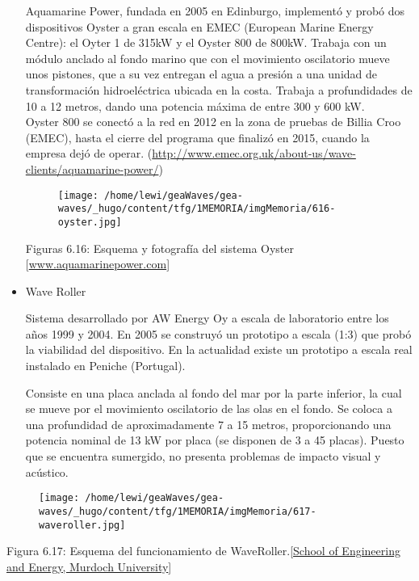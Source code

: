 \documentclass[]{article}
\begin{document}
\begin{itemize}
  Aquamarine Power, fundada en 2005 en Edinburgo, implementó y probó dos
  dispositivos Oyster a gran escala en EMEC (European Marine Energy
  Centre): el Oyter 1 de 315kW y el Oyster 800 de 800kW. Trabaja con un
  módulo anclado al fondo marino que con el movimiento oscilatorio mueve
  unos pistones, que a su vez entregan el agua a presión a una unidad de
  transformación hidroeléctrica ubicada en la costa. Trabaja a
  profundidades de 10 a 12 metros, dando una potencia máxima de entre
  300 y 600 kW.\\

  Oyster 800 se conectó a la red en 2012 en la zona de pruebas de Billia
  Croo (EMEC), hasta el cierre del programa que finalizó en 2015, cuando
  la empresa dejó de operar.
  (\url{http://www.emec.org.uk/about-us/wave-clients/aquamarine-power/})

  \begin{figure}
  \centering
  \texttt{[image: /home/lewi/geaWaves/gea-waves/\_hugo/content/tfg/1MEMORIA/imgMemoria/616-oyster.jpg]}
  \caption{}
  \end{figure}

  Figuras 6.16: Esquema y fotografía del sistema Oyster
  {[}\url{www.aquamarinepower.com}{]}
\item
  Wave Roller

  Sistema desarrollado por AW Energy Oy a escala de laboratorio entre
  los años 1999 y 2004. En 2005 se construyó un prototipo a escala (1:3)
  que probó la viabilidad del dispositivo. En la actualidad existe un
  prototipo a escala real instalado en Peniche (Portugal).

  Consiste en una placa anclada al fondo del mar por la parte inferior,
  la cual se mueve por el movimiento oscilatorio de las olas en el
  fondo. Se coloca a una profundidad de aproximadamente 7 a 15 metros,
  proporcionando una potencia nominal de 13 kW por placa (se disponen de
  3 a 45 placas). Puesto que se encuentra sumergido, no presenta
  problemas de impacto visual y acústico.
\end{itemize}

\begin{figure}
\centering
\texttt{[image: /home/lewi/geaWaves/gea-waves/\_hugo/content/tfg/1MEMORIA/imgMemoria/617-waveroller.jpg]}
\caption{}
\end{figure}

Figura 6.17: Esquema del funcionamiento de
WaveRoller.{[}\href{http://www.see.murdoch.edu.au/resources/info/Tech/wave/}{School
of Engineering and Energy, Murdoch University}{]}
\end{document}
